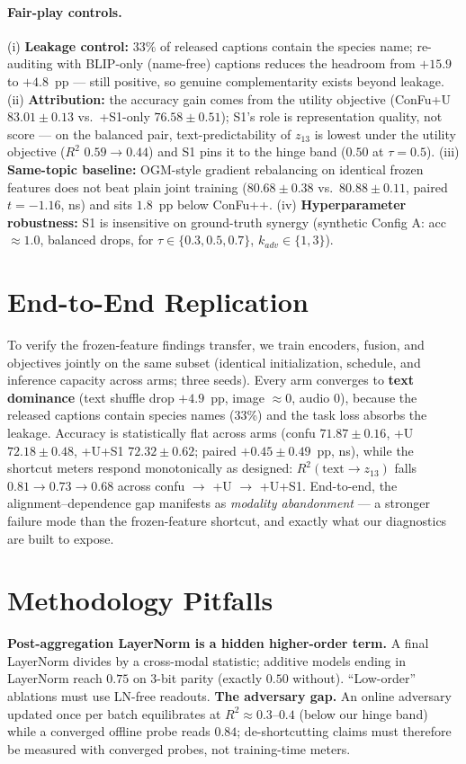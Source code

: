 \documentclass[10pt,twocolumn]{article}
\begin{document}
\paragraph{Fair-play controls.} (i) \textbf{Leakage control:} $33\%$ of released captions
contain the species name; re-auditing with BLIP-only (name-free) captions reduces the headroom
from $+15.9$ to $+4.8$~pp --- still positive, so genuine complementarity exists beyond leakage.
(ii) \textbf{Attribution:} the accuracy gain comes from the utility objective (ConFu+U
$83.01{\pm}0.13$ vs.\ +S1-only $76.58{\pm}0.51$); S1's role is representation quality, not
score --- on the balanced pair, text-predictability of $z_{13}$ is lowest under the utility
objective ($R^2$ $0.59{\to}0.44$) and S1 pins it to the hinge band ($0.50$ at $\tau{=}0.5$).
(iii) \textbf{Same-topic baseline:} OGM-style gradient rebalancing on identical frozen features
does not beat plain joint training ($80.68{\pm}0.38$ vs.\ $80.88{\pm}0.11$, paired
$t{=}{-}1.16$, ns) and sits $1.8$~pp below ConFu++. (iv) \textbf{Hyperparameter robustness:}
S1 is insensitive on ground-truth synergy (synthetic Config A: acc ${\approx}1.0$, balanced
drops, for $\tau{\in}\{0.3,0.5,0.7\}$, $k_{adv}{\in}\{1,3\}$).

\section{End-to-End Replication}\label{sec:e2e}
To verify the frozen-feature findings transfer, we train encoders, fusion, and objectives jointly
on the same subset (identical initialization, schedule, and inference capacity across arms; three
seeds). Every arm converges to \textbf{text dominance} (text shuffle drop ${+}4.9$~pp, image
${\approx}0$, audio $0$), because the released captions contain species names (33\%) and the
task loss absorbs the leakage. Accuracy is statistically flat across arms (confu $71.87{\pm}0.16$,
+U $72.18{\pm}0.48$, +U+S1 $72.32{\pm}0.62$; paired $+0.45{\pm}0.49$~pp, ns), while the
shortcut meters respond monotonically as designed: $R^2(\mathrm{text}{\to}z_{13})$ falls
$0.81 \to 0.73 \to 0.68$ across confu $\to$ +U $\to$ +U+S1. End-to-end, the
alignment--dependence gap manifests as \emph{modality abandonment} --- a stronger failure mode
than the frozen-feature shortcut, and exactly what our diagnostics are built to expose.

\section{Methodology Pitfalls}\label{sec:pitfalls}
\textbf{Post-aggregation LayerNorm is a hidden higher-order term.} A final LayerNorm divides by a
cross-modal statistic; additive models ending in LayerNorm reach $0.75$ on 3-bit parity (exactly
$0.50$ without). ``Low-order'' ablations must use LN-free readouts.
\textbf{The adversary gap.} An online adversary updated once per batch equilibrates at
$R^2\approx0.3$--$0.4$ (below our hinge band) while a converged offline probe reads $0.84$;
de-shortcutting claims must therefore be measured with converged probes, not training-time meters.
\end{document}
